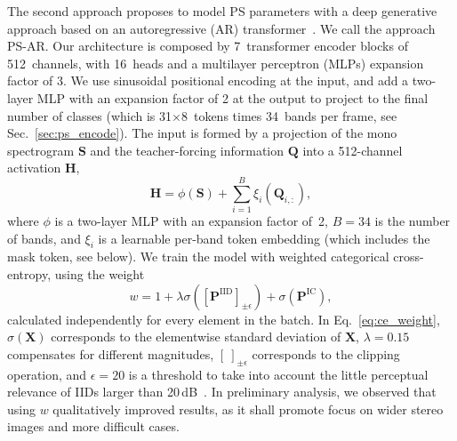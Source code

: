 \documentclass{article}
\newcommand{\ma}[1]{\textbf{#1}}
\begin{document}
The second approach proposes to model PS parameters with a deep generative approach based on an autoregressive (AR) transformer~\cite{Radford_2018}. We call the approach PS-AR. Our architecture is composed by 7~transformer encoder blocks of 512~channels, with 16~heads and a multilayer perceptron (MLPs) expansion factor of 3. We use sinusoidal positional encoding at the input, and add a two-layer MLP with an expansion factor of 2 at the output to project to the final number of classes (which is 31$\times$8~tokens times 34~bands per frame, see Sec.~\ref{sec:ps_encode}). The input is formed by a projection of the mono spectrogram $\ma{S}$ and the teacher-forcing information $\ma{Q}$ into a 512-channel activation $\ma{H}$,
\begin{equation}
    \ma{H} = \phi(\ma{S}) + \sum_{i=1}^{B} \xi_i(\ma{Q}_{i,:}) ,
    \label{eq:dnn_input}
\end{equation}
where $\phi$ is a two-layer MLP with an expansion factor of~2, $B=34$ is the number of bands, and $\xi_i$ is a learnable per-band token embedding (which includes the mask token, see below). We train the model with weighted categorical cross-entropy, using the weight
\begin{equation}
    w = 1 + \lambda\sigma\left( \left[\ma{P}^{\text{IID}}\right]_{\pm\epsilon} \right) + \sigma(\ma{P}^{\text{IC}}) ,
    \label{eq:ce_weight}
\end{equation}
calculated independently for every element in the batch. In Eq.~\ref{eq:ce_weight}, $\sigma(\ma{X})$ corresponds to the elementwise standard deviation of $\ma{X}$, $\lambda=0.15$ compensates for different magnitudes, $[~]_{\pm\epsilon}$ corresponds to the clipping operation, and $\epsilon=20$ is a threshold to take into account the little perceptual relevance of IIDs larger than 20\,dB~\cite{Bartlett_1991}. In preliminary analysis, we observed that using $w$ qualitatively improved results, as it shall promote focus on wider stereo images and more difficult cases. 
\end{document}
